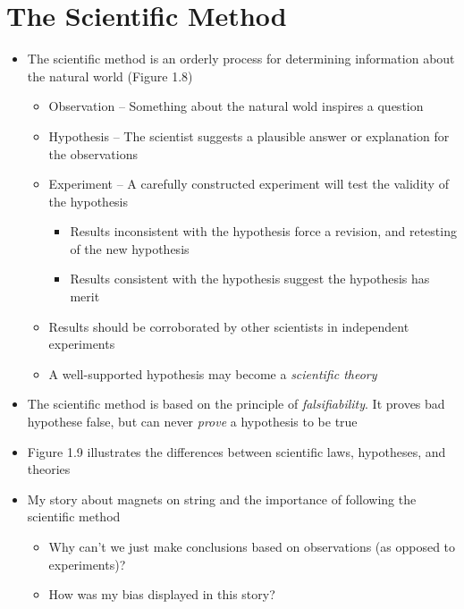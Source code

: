 \documentclass[12pt, openany, letterpaper]{memoir}
\begin{document}
\section{The Scientific Method}
\begin{itemize}
	\item The scientific method is an orderly process for determining information about the natural world (Figure 1.8)
	\begin{itemize}
		\item Observation -- Something about the natural wold inspires a question
		\item Hypothesis -- The scientist suggests a plausible answer or explanation for the observations
		\item Experiment -- A carefully constructed experiment will test the validity of the hypothesis
		\begin{itemize}
			\item Results inconsistent with the hypothesis force a revision, and retesting of the new hypothesis
			\item Results consistent with the hypothesis suggest the hypothesis has merit
		\end{itemize}
		\item Results should be corroborated by other scientists in independent experiments
		\item A well-supported hypothesis may become a \emph{scientific theory}
	\end{itemize}
	\item The scientific method is based on the principle of \emph{falsifiability}. It proves bad hypothese false, but can never \emph{prove} a hypothesis to be true
	\item Figure 1.9 illustrates the differences between scientific laws, hypotheses, and theories
	\item My story about magnets on string and the importance of following the scientific method
	\begin{itemize}
		\item Why can't we just make conclusions based on observations (as opposed to experiments)?
		\item How was my bias displayed in this story?
	\end{itemize}
\end{itemize}
\end{document}
